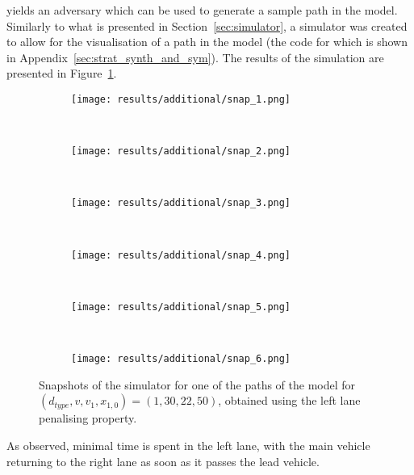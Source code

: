 yields an adversary which can be used to generate a sample path in the model. Similarly to what is presented in Section~\ref{sec:simulator}, a simulator was created to allow for the visualisation of a path in the model (the code for which is shown in Appendix~\ref{sec:strat_synth_and_sym}). The results of the simulation are presented in Figure~\ref{fig:lane_penalising_sim}.

\begin{figure}[H]
\centering
\begin{subfigure}{0.75\textwidth}
  \centering
  \texttt{[image: results/additional/snap\_1.png]}
\end{subfigure}\\ \vspace{2px}
\begin{subfigure}{0.75\textwidth}
  \centering
  \texttt{[image: results/additional/snap\_2.png]}
\end{subfigure} \\ \vspace{2px}
\begin{subfigure}{0.75\textwidth}
  \centering
  \texttt{[image: results/additional/snap\_3.png]}
\end{subfigure} \\ \vspace{2px}
\begin{subfigure}{0.75\textwidth}
  \centering
  \texttt{[image: results/additional/snap\_4.png]}
\end{subfigure} \\ \vspace{2px}
\begin{subfigure}{0.75\textwidth}
  \centering
  \texttt{[image: results/additional/snap\_5.png]}
\end{subfigure} \\ \vspace{2px}
\begin{subfigure}{0.75\textwidth}
  \centering
  \texttt{[image: results/additional/snap\_6.png]}
\end{subfigure}
\caption{Snapshots of the simulator for one of the paths of the model for $(d_{type}, v, v_1, x_{1,0}) = (1, 30, 22, 50)$, obtained using the left lane penalising property.}
\label{fig:lane_penalising_sim}
\end{figure}

As observed, minimal time is spent in the left lane, with the main vehicle returning to the right lane as soon as it passes the lead vehicle.

